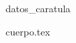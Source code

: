 \documentclass[12pt, a4paper]{article}
\begin{document}

     {datos_caratula}

    
	 {cuerpo.tex}

\end{document}
